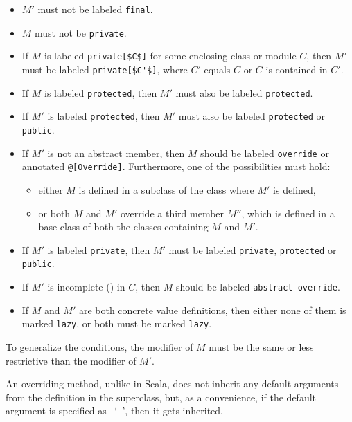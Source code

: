 \begin{itemize}
\item 
$M'$ must not be labeled \lstinline!final!. 

\item 
$M$ must not be \lstinline!private!. 

\item 
If $M$ is labeled \lstinline!private[$C$]! for some enclosing class or module $C$, then $M'$ must be labeled \lstinline!private[$C'$]!, where $C'$ equals $C$ or $C$ is contained in $C'$. %

\item 
If $M$ is labeled \lstinline!protected!, then $M'$ must also be labeled \lstinline!protected!. 

\item 
If $M'$ is labeled \lstinline!protected!, then $M'$ must also be labeled \lstinline!protected! or \lstinline!public!. 

\item
If $M'$ is not an abstract member, then $M$ should be labeled \lstinline!override! or annotated \lstinline!@[Override]!. Furthermore, one of the possibilities must hold:
\begin{itemize}
\item either $M$ is defined in a subclass of the class where $M'$ is defined,
\item or both $M$ and $M'$ override a third member $M''$, which is defined in a base class of both the classes containing $M$ and $M'$.
\end{itemize}

\item 
If $M'$ is labeled \lstinline!private!, then $M'$ must be labeled \lstinline!private!, \lstinline!protected! or \lstinline!public!. 

\item
If $M'$ is incomplete () in $C$, then $M$ should be labeled \lstinline!abstract override!. 

\item
If $M$ and $M'$ are both concrete value definitions, then either none of them is marked \lstinline!lazy!, or both must be marked \lstinline!lazy!. 
\end{itemize}

To generalize the conditions, the modifier of $M$ must be the same or less restrictive than the modifier of $M'$. 

An overriding method, unlike in Scala, does not inherit any default arguments from the definition in the superclass, but, as a convenience, if the default argument is specified as ~`\lstinline!_!', then it gets inherited. 





